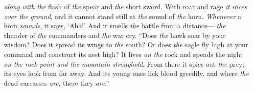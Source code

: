 \begin{biblechapter}
\textit{along with} \textit{the} flash of \textit{the} spear and \textit{the} short sword.
\verse With roar and rage \textit{it races over the ground}, 
and it cannot stand still at \textit{the} sound of \textit{the} horn.
\verse \textit{Whenever} a horn \textit{sounds}, it says, ‘Aha!’ 
And it smells \textit{the} battle from a distance— 
\textit{the} thunder of \textit{the} commanders and \textit{the} war cry.
\verse “Does \textit{the} hawk soar by your wisdom? 
Does it spread its wings to \textit{the} south?
\verse Or does \textit{the} eagle fly high at your command 
and construct its nest high?
\verse It lives \textit{on the} rock and spends the night 
\textit{on the rock point and the mountain stronghold}.
\verse From there it spies out \textit{the} prey; 
its eyes look from far away.
\verse And its young ones lick blood greedily, 
and where \textit{the} dead carcasses \textit{are}, there they \textit{are}.”
\end{biblechapter}


